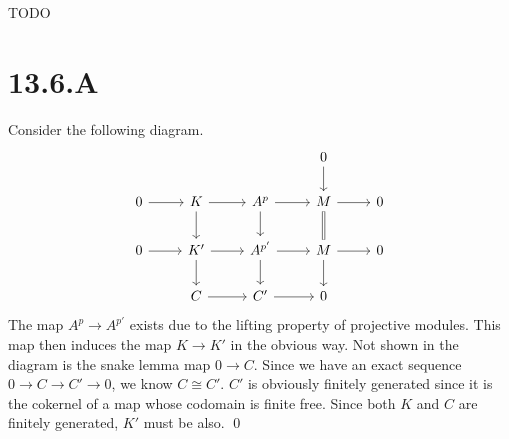 \documentclass{article}
\begin{document}
TODO

\section{13.6.A}
Consider the following diagram. \[\begin{tikzcd}
          & {}   &          & 0     \\
        0 & K    & {A^p}    & M & 0 \\
        0 & {K'} & {A^{p'}} & M & 0 \\
          & C    & {C'}     & 0
        \arrow[Rightarrow, no head, from=2-4, to=3-4]
        \arrow[from=2-3, to=3-3]
        \arrow[from=2-2, to=3-2]
        \arrow[from=2-1, to=2-2]
        \arrow[from=3-1, to=3-2]
        \arrow[from=2-2, to=2-3]
        \arrow[from=3-2, to=3-3]
        \arrow[from=3-3, to=3-4]
        \arrow[from=2-3, to=2-4]
        \arrow[from=2-4, to=2-5]
        \arrow[from=3-4, to=3-5]
        \arrow[from=1-4, to=2-4]
        \arrow[from=3-4, to=4-4]
        \arrow[from=3-2, to=4-2]
        \arrow[from=3-3, to=4-3]
        \arrow[from=4-2, to=4-3]
        \arrow[from=4-3, to=4-4]
    \end{tikzcd}\] The map
$A^p \to A^{p'}$ exists due to the lifting property of projective
modules. This map then induces the map $K \to K'$ in the obvious
way. Not shown in the diagram is the snake lemma map $0 \to C$.
Since we have an exact sequence $0 \to C \to C' \to 0$, we know
$C \cong C'$. $C'$ is obviously finitely
generated since it is the cokernel of a map whose codomain is finite free.
Since both $K$ and $C$ are finitely
generated, $K'$ must be also. \qed
\end{document}
